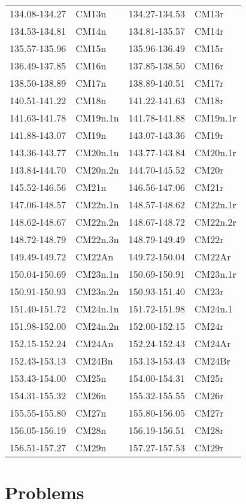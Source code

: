 \begin{center}
\begin{longtable}{ll|ll}
134.08-134.27 & CM13n & 134.27-134.53 & CM13r\\
134.53-134.81 & CM14n & 134.81-135.57 & CM14r\\
135.57-135.96 & CM15n & 135.96-136.49 & CM15r\\
136.49-137.85 & CM16n & 137.85-138.50 & CM16r\\
138.50-138.89 & CM17n & 138.89-140.51 & CM17r\\
140.51-141.22 & CM18n & 141.22-141.63 & CM18r\\
141.63-141.78 & CM19n.1n & 141.78-141.88 & CM19n.1r\\
141.88-143.07 & CM19n & 143.07-143.36 & CM19r\\
143.36-143.77 & CM20n.1n & 143.77-143.84 & CM20n.1r\\
143.84-144.70 & CM20n.2n & 144.70-145.52 & CM20r\\
145.52-146.56 & CM21n & 146.56-147.06 & CM21r\\
147.06-148.57 & CM22n.1n & 148.57-148.62 & CM22n.1r\\
148.62-148.67 & CM22n.2n & 148.67-148.72 & CM22n.2r\\
148.72-148.79 & CM22n.3n & 148.79-149.49 & CM22r\\
149.49-149.72 & CM22An & 149.72-150.04 & CM22Ar\\
150.04-150.69 & CM23n.1n & 150.69-150.91 & CM23n.1r\\
150.91-150.93 & CM23n.2n & 150.93-151.40 & CM23r\\
151.40-151.72 & CM24n.1n & 151.72-151.98 & CM24n.1\\
151.98-152.00 & CM24n.2n & 152.00-152.15 & CM24r\\
152.15-152.24 & CM24An & 152.24-152.43 & CM24Ar\\
152.43-153.13 & CM24Bn & 153.13-153.43 & CM24Br\\
153.43-154.00 & CM25n & 154.00-154.31 & CM25r\\
154.31-155.32 & CM26n & 155.32-155.55 & CM26r\\
155.55-155.80 & CM27n & 155.80-156.05 & CM27r\\
156.05-156.19 & CM28n & 156.19-156.51 & CM28r\\
156.51-157.27 & CM29n & 157.27-157.53 & CM29r\\
\end{longtable}
\end{center}



\clearpage

\section{Problems}

